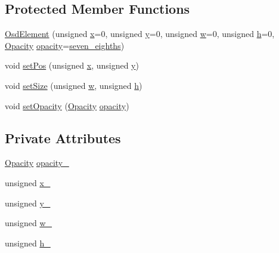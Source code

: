 \subsection*{Protected Member Functions}
\begin{DoxyCompactItemize}
\item 
\hyperlink{classgambatte_1_1OsdElement_a336e0cfacaf884c2a58ff8e9c3f16b29}{Osd\+Element} (unsigned \hyperlink{classgambatte_1_1OsdElement_a76531a91472fdd9166a5536e1ff8f420}{x}=0, unsigned \hyperlink{classgambatte_1_1OsdElement_a5f0f2260752e7f2ebcc93b1007c5c0f7}{y}=0, unsigned \hyperlink{classgambatte_1_1OsdElement_ae7609268223e37561e634323cea5a467}{w}=0, unsigned \hyperlink{classgambatte_1_1OsdElement_a06b0891145ca9aac2d10cf9646681ce3}{h}=0, \hyperlink{classgambatte_1_1OsdElement_a1e52ecfbc0d4337e1f2b38d6c4a97636}{Opacity} \hyperlink{classgambatte_1_1OsdElement_a17774fcbd38501a675f3dfb616be23ad}{opacity}=\hyperlink{classgambatte_1_1OsdElement_a1e52ecfbc0d4337e1f2b38d6c4a97636a1f8c4eebdca1a18dff836db5d55de550}{seven\+\_\+eighths})
\item 
void \hyperlink{classgambatte_1_1OsdElement_a5db63583e31737345cb0109d117077c7}{set\+Pos} (unsigned \hyperlink{classgambatte_1_1OsdElement_a76531a91472fdd9166a5536e1ff8f420}{x}, unsigned \hyperlink{classgambatte_1_1OsdElement_a5f0f2260752e7f2ebcc93b1007c5c0f7}{y})
\item 
void \hyperlink{classgambatte_1_1OsdElement_a566b89fc3cb39184c482e00352f7efda}{set\+Size} (unsigned \hyperlink{classgambatte_1_1OsdElement_ae7609268223e37561e634323cea5a467}{w}, unsigned \hyperlink{classgambatte_1_1OsdElement_a06b0891145ca9aac2d10cf9646681ce3}{h})
\item 
void \hyperlink{classgambatte_1_1OsdElement_acd4544536520e9d9ad3d19a38215a82d}{set\+Opacity} (\hyperlink{classgambatte_1_1OsdElement_a1e52ecfbc0d4337e1f2b38d6c4a97636}{Opacity} \hyperlink{classgambatte_1_1OsdElement_a17774fcbd38501a675f3dfb616be23ad}{opacity})
\end{DoxyCompactItemize}
\subsection*{Private Attributes}
\begin{DoxyCompactItemize}
\item 
\hyperlink{classgambatte_1_1OsdElement_a1e52ecfbc0d4337e1f2b38d6c4a97636}{Opacity} \hyperlink{classgambatte_1_1OsdElement_a8e0c08fc4f238f49f1be0ab1e1c8c3ae}{opacity\+\_\+}
\item 
unsigned \hyperlink{classgambatte_1_1OsdElement_a87363dded4d84ae8e2651ad8b47fe1cd}{x\+\_\+}
\item 
unsigned \hyperlink{classgambatte_1_1OsdElement_a456ab2afbbcb863d4f1cec020b474526}{y\+\_\+}
\item 
unsigned \hyperlink{classgambatte_1_1OsdElement_af24341f068a6b693b9a2c79aeb30feec}{w\+\_\+}
\item 
unsigned \hyperlink{classgambatte_1_1OsdElement_ad1b57b8c319726dcf85c1ce1a5d5e73b}{h\+\_\+}
\end{DoxyCompactItemize}



